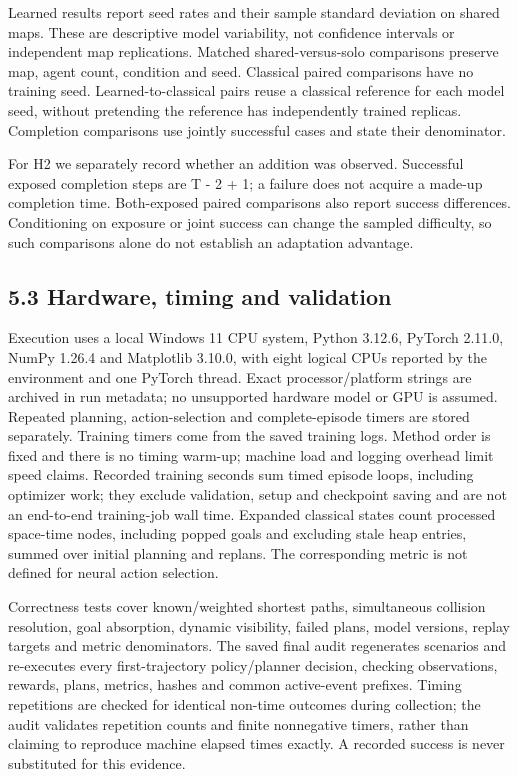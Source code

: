 \documentclass[10pt,a4paper]{article}
\begin{document}
Learned results report seed rates and their sample standard deviation on shared
maps. These are descriptive model variability, not confidence intervals or
independent map replications. Matched shared-versus-solo comparisons preserve
map, agent count, condition and seed. Classical paired comparisons have no
training seed. Learned-to-classical pairs reuse a classical reference for each
model seed, without pretending the reference has independently trained replicas.
Completion comparisons use jointly successful cases and state their denominator.

For H2 we separately record whether an addition was observed. Successful
exposed completion steps are T - 2 + 1; a failure does not acquire a made-up
completion time. Both-exposed paired comparisons also report success differences.
Conditioning on exposure or joint success can change the sampled difficulty,
so such comparisons alone do not establish an adaptation advantage.

\subsection*{5.3 Hardware, timing and validation}

Execution uses a local Windows 11 CPU system, Python 3.12.6, PyTorch 2.11.0,
NumPy 1.26.4 and Matplotlib 3.10.0, with eight logical CPUs reported by the
environment and one PyTorch thread. Exact processor/platform strings are archived
in run metadata; no unsupported hardware model or GPU is assumed. Repeated
planning, action-selection and complete-episode timers are stored separately.
Training timers come from the saved training logs. Method order is fixed and
there is no timing warm-up; machine load and logging overhead limit speed claims.
Recorded training seconds sum timed episode loops, including optimizer work;
they exclude validation, setup and checkpoint saving and are not an end-to-end
training-job wall time.
Expanded classical states count processed space-time nodes, including popped
goals and excluding stale heap entries, summed over initial planning and replans.
The corresponding metric is not defined for neural action selection.

Correctness tests cover known/weighted shortest paths, simultaneous collision
resolution, goal absorption, dynamic visibility, failed plans, model versions,
replay targets and metric denominators. The saved final audit regenerates
scenarios and re-executes every first-trajectory policy/planner decision, checking
observations, rewards, plans, metrics, hashes and common active-event prefixes.
Timing repetitions are checked for identical non-time outcomes during collection;
the audit validates repetition counts and finite nonnegative timers, rather than
claiming to reproduce machine elapsed times exactly. A recorded success is never
substituted for this evidence.
\end{document}
